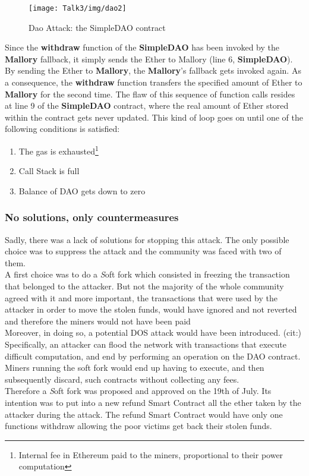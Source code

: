 \begin{figure}[H]
\begin{center}
\texttt{[image: Talk3/img/dao2]}
\end{center}
\caption{Dao Attack: the SimpleDAO contract}
\label{label}
\end{figure}
Since the \textbf{withdraw} function of the \textbf{SimpleDAO} has been invoked by the \textbf{Mallory} fallback, it simply sends the Ether to Mallory (line 6, \textbf{SimpleDAO}). By sending the Ether to \textbf{Mallory}, the \textbf{Mallory}'s fallback gets invoked again. As a consequence, the \textbf{withdraw} function transfers the specified amount of Ether to \textbf{Mallory} for the second time. The flaw of this sequence of function calls resides at line 9 of the \textbf{SimpleDAO} contract, where the real amount of Ether stored within the contract gets never updated. 
This kind of loop goes on until one of the following conditions is satisfied: \\
\begin{enumerate}
\item The gas is exhausted\footnote{Internal fee in Ethereum paid to the miners, proportional to their power computation\cite{SC11}}
\item Call Stack is full
\item Balance of DAO gets down to zero  
\end{enumerate}





\subsubsection{No solutions, only countermeasures}
Sadly, there was a lack of solutions for stopping this attack. The only possible choice was to suppress the attack and the community was faced with two of them.
\\A first choice was to do a {\textit Soft fork} which consisted in freezing the transaction that belonged to the attacker. But not the majority of the whole community agreed with it and more important, the transactions that were used by the attacker in order to move the stolen funds, would have ignored and not reverted and therefore the miners would not have been paid
\\Moreover, in doing so, a potential DOS attack would have been introduced. 
(cit:)
Specifically, an attacker can flood the network with transactions that execute difficult computation, and end by performing an operation on the DAO contract. Miners running the soft fork would end up having to execute, and then subsequently discard, such contracts without collecting any fees.
\\Therefore a {\textit Soft fork} was proposed and approved on the 19th of July. Its intention was to put into a new refund Smart Contract all the ether taken by the attacker during the attack. The refund Smart Contract would have only one functions withdraw allowing the poor victims get back their stolen funds.

